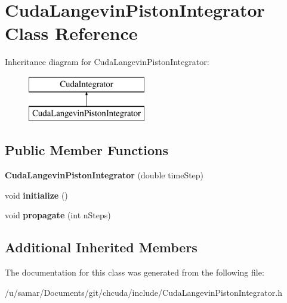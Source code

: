 \hypertarget{classCudaLangevinPistonIntegrator}{}\section{Cuda\+Langevin\+Piston\+Integrator Class Reference}
\label{classCudaLangevinPistonIntegrator}
Inheritance diagram for Cuda\+Langevin\+Piston\+Integrator\+:\begin{figure}[H]
\begin{center}
\leavevmode
\includegraphics[height=2.000000cm]{classCudaLangevinPistonIntegrator}
\end{center}
\end{figure}
\subsection*{Public Member Functions}
\begin{DoxyCompactItemize}
\item 
\hypertarget{classCudaLangevinPistonIntegrator_a155720cf3dfca2b6f602d02af7b314e6}{}\label{classCudaLangevinPistonIntegrator_a155720cf3dfca2b6f602d02af7b314e6} 
{\bfseries Cuda\+Langevin\+Piston\+Integrator} (double time\+Step)
\item 
\hypertarget{classCudaLangevinPistonIntegrator_aa79fb4345b13e2a579e19e501bf46b1d}{}\label{classCudaLangevinPistonIntegrator_aa79fb4345b13e2a579e19e501bf46b1d} 
void {\bfseries initialize} ()
\item 
\hypertarget{classCudaLangevinPistonIntegrator_a3d7261a1661992bc0e24d599307d1489}{}\label{classCudaLangevinPistonIntegrator_a3d7261a1661992bc0e24d599307d1489} 
void {\bfseries propagate} (int n\+Steps)
\end{DoxyCompactItemize}
\subsection*{Additional Inherited Members}


The documentation for this class was generated from the following file\+:\begin{DoxyCompactItemize}
\item 
/u/samar/\+Documents/git/chcuda/include/Cuda\+Langevin\+Piston\+Integrator.\+h\end{DoxyCompactItemize}
